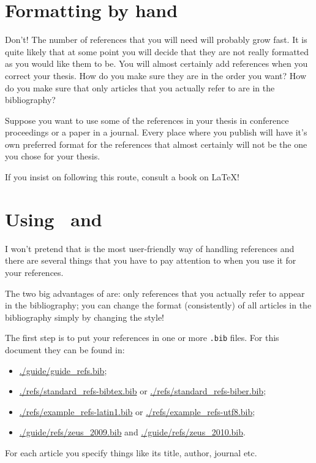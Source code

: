 \section{Formatting by hand}
\label{sec:ref:bibitem}

Don't! The number of references that you will need will probably grow
fast. It is quite likely that at some point you will decide that they
are not really formatted as you would like them to be. You will almost
certainly add references when you correct your thesis. How do you
make sure they are in the order you want? How do you make sure that
only articles that you actually refer to are in the bibliography?

Suppose you want to use some of the references in your thesis in
conference proceedings or a paper in a journal. Every place where you
publish will have it's own preferred format for the references that
almost certainly will not be the one you chose for your thesis.

If you insist on following this route, consult a book on \LaTeX!


\section{Using \BibTeX\ and }
\label{sec:ref:bibtex}

I won't pretend that \BibTeX{} is the most user-friendly way of
handling references and there are several things that you have to pay
attention to when you use it for your references.

The two big advantages of \BibTeX{} are: only references that you
actually refer to appear in the bibliography; you can change the
format (consistently) of all articles in the bibliography simply by
changing the style!

The first step is to put your references in one or more \texttt{.bib}
files. For this document they can be found in:
\begin{itemize}
\setlength{\itemsep}{0pt}
\item \url{./guide/guide_refs.bib};
\item \url{./refs/standard_refs-bibtex.bib} or
  \url{./refs/standard_refs-biber.bib};
\item \url{./refs/example_refs-latin1.bib} or
  \url{./refs/example_refs-utf8.bib};
\item \url{./guide/refs/zeus_2009.bib} and
  \url{./guide/refs/zeus_2010.bib}.
\end{itemize}
For each article you specify things like its
title, author, journal etc.


